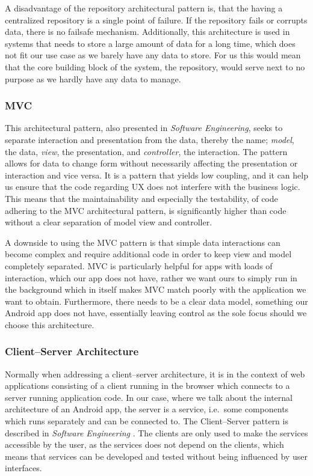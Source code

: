 A disadvantage of the repository architectural pattern is, that the having a centralized repository is a single point of failure.
If the repository fails or corrupts data, there is no failsafe mechanism.
Additionally, this architecture is used in systems that needs to store a large amount of data for a long time, which does not fit our use case as we barely have any data to store.
For us this would mean that the core building block of the system, the repository, would serve next to no purpose as we hardly have any data to manage.

\subsubsection{\acl{MVC}}
This architectural pattern, also presented in \textit{Software Engineering}\cite[p. 176]{sommerville}, seeks to separate interaction and presentation from the data, thereby the name; \textit{model}, the data, \textit{view}, the presentation, and \textit{controller}, the interaction.
The pattern allows for data to change form without necessarily affecting the presentation or interaction and vice versa.
It is a pattern that yields low coupling, and it can help us ensure that the code regarding \ac{UX} does not interfere with the business logic.
This means that the maintainability and especially the testability, of code adhering to the \ac{MVC} architectural pattern, is significantly higher than code without a clear separation of model view and controller.

A downside to using the MVC pattern is that simple data interactions can become complex and require additional code in order to keep view and model completely separated.
MVC is particularly helpful for apps with loads of interaction, which our app does not have, rather we want ours to simply run in the background which in itself makes MVC match poorly with the application we want to obtain.
Furthermore, there needs to be a clear data model, something our Android app does not have, essentially leaving control as the sole focus should we choose this architecture.

\subsubsection{Client--Server Architecture}
Normally when addressing a client--server architecture, it is in the context of web applications consisting of a client running in the browser which connects to a server running application code.
In our case, where we talk about the internal architecture of an Android app, the server is a service, i.e.~some components which runs separately and can be connected to.
The Client--Server pattern is described in \textit{Software Engineering} \cite[p. 180-181]{sommerville}.
The clients are only used to make the services accessible by the user, as the services does not depend on the clients, which means that services can be developed and tested without being influenced by user interfaces.

